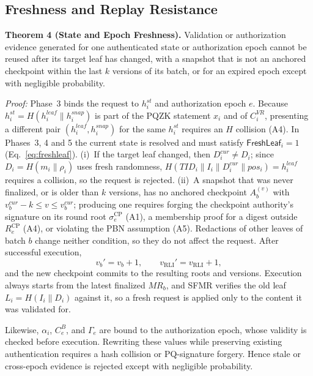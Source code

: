 \documentclass[lettersize,journal]{IEEEtran}
\begin{document}
\subsection{Freshness and Replay Resistance}

\textbf{Theorem 4 (State and Epoch Freshness).}
Validation or authorization evidence generated for one authenticated
state or authorization epoch cannot be reused \textcolor{e1}{after its
target leaf has changed, with a snapshot that is not an anchored
checkpoint within the last $k$ versions of its batch,} or for an expired
epoch except with negligible probability.

\emph{Proof:}
Phase~3 binds the request to $h_i^{st}$ and authorization epoch $e$.
\textcolor{e1}{Because $h_i^{st}=H(h_i^{leaf}\parallel h_i^{snap})$ is
part of the PQZK statement $x_i$ and of $C_i^{VR}$, presenting a different
pair $(h_i^{leaf},h_i^{snap})$ for the same $h_i^{st}$ requires an $H$
collision (A4). In Phases~3, 4 and 5 the current state is resolved and
must satisfy $\mathsf{FreshLeaf}_i=1$ (Eq.~\eqref{eq:freshleaf}).
(i)~If the target leaf changed, then $D_i^{cur}\neq D_i$; since
$D_i=H(m_i\parallel\rho_i)$ uses fresh randomness,
$H(TID_i\parallel I_i\parallel D_i^{cur}\parallel pos_i)=h_i^{leaf}$
requires a collision, so the request is rejected. (ii)~A snapshot that
was never finalized, or is older than $k$ versions, has no anchored
checkpoint $A_b^{(v)}$ with $v_b^{cur}-k\le v\le v_b^{cur}$; producing one
requires \textcolor{e5}{forging the checkpoint authority's signature on its round root
$\sigma_e^{\mathrm{CP}}$ (A1), a membership proof for a digest outside
$R_e^{\mathrm{CP}}$ (A4),} or violating the PBN assumption (A5).
Redactions of other leaves of batch $b$ change neither condition, so they
do not affect the request.}
After successful execution,
\begin{equation}
v_b'=v_b+1,
\qquad
v_{\mathrm{RLI}}'=v_{\mathrm{RLI}}+1,
\end{equation}
and the new checkpoint commits to the resulting roots and versions.
\textcolor{e1}{Execution always starts from the latest finalized $MR_b$,
and SFMR verifies the old leaf $L_i=H(I_i\parallel D_i)$ against it, so a
fresh request is applied only to the content it was validated for.}

Likewise,
$\alpha_i$, $C_e^B$, and $\Gamma_e$ are bound to the authorization
epoch, whose validity is checked before execution. Rewriting these
values while preserving existing authentication requires a hash
collision or PQ-signature forgery. Hence stale or cross-epoch evidence
is rejected except with negligible probability.
\end{document}
